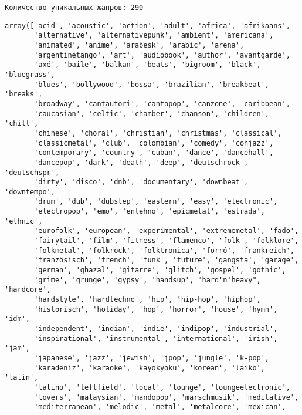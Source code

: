 \documentclass[11pt]{article}
\makeatletter
\newcommand{\boxspacing}{\kern\kvtcb@left@rule\kern\kvtcb@boxsep}
\newcommand{\prompt}[4]{
        {\ttfamily\llap{{\color{#2}[#3]:\hspace{3pt}#4}}\vspace{-\baselineskip}}
    }
\makeatother
\begin{document}
    \begin{Verbatim}[commandchars=\\\{\}]
Количество уникальных жанров: 290
    \end{Verbatim}

            \begin{tcolorbox}[breakable, size=fbox, boxrule=.5pt, pad at break*=1mm, opacityfill=0]
\prompt{Out}{outcolor}{11}{\boxspacing}
\begin{Verbatim}[commandchars=\\\{\}]
array(['acid', 'acoustic', 'action', 'adult', 'africa', 'afrikaans',
       'alternative', 'alternativepunk', 'ambient', 'americana',
       'animated', 'anime', 'arabesk', 'arabic', 'arena',
       'argentinetango', 'art', 'audiobook', 'author', 'avantgarde',
       'axé', 'baile', 'balkan', 'beats', 'bigroom', 'black', 'bluegrass',
       'blues', 'bollywood', 'bossa', 'brazilian', 'breakbeat', 'breaks',
       'broadway', 'cantautori', 'cantopop', 'canzone', 'caribbean',
       'caucasian', 'celtic', 'chamber', 'chanson', 'children', 'chill',
       'chinese', 'choral', 'christian', 'christmas', 'classical',
       'classicmetal', 'club', 'colombian', 'comedy', 'conjazz',
       'contemporary', 'country', 'cuban', 'dance', 'dancehall',
       'dancepop', 'dark', 'death', 'deep', 'deutschrock', 'deutschspr',
       'dirty', 'disco', 'dnb', 'documentary', 'downbeat', 'downtempo',
       'drum', 'dub', 'dubstep', 'eastern', 'easy', 'electronic',
       'electropop', 'emo', 'entehno', 'epicmetal', 'estrada', 'ethnic',
       'eurofolk', 'european', 'experimental', 'extrememetal', 'fado',
       'fairytail', 'film', 'fitness', 'flamenco', 'folk', 'folklore',
       'folkmetal', 'folkrock', 'folktronica', 'forró', 'frankreich',
       'französisch', 'french', 'funk', 'future', 'gangsta', 'garage',
       'german', 'ghazal', 'gitarre', 'glitch', 'gospel', 'gothic',
       'grime', 'grunge', 'gypsy', 'handsup', "hard'n'heavy", 'hardcore',
       'hardstyle', 'hardtechno', 'hip', 'hip-hop', 'hiphop',
       'historisch', 'holiday', 'hop', 'horror', 'house', 'hymn', 'idm',
       'independent', 'indian', 'indie', 'indipop', 'industrial',
       'inspirational', 'instrumental', 'international', 'irish', 'jam',
       'japanese', 'jazz', 'jewish', 'jpop', 'jungle', 'k-pop',
       'karadeniz', 'karaoke', 'kayokyoku', 'korean', 'laiko', 'latin',
       'latino', 'leftfield', 'local', 'lounge', 'loungeelectronic',
       'lovers', 'malaysian', 'mandopop', 'marschmusik', 'meditative',
       'mediterranean', 'melodic', 'metal', 'metalcore', 'mexican',

\end{Verbatim}
\end{tcolorbox}
\end{document}
